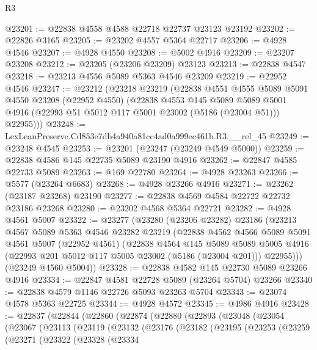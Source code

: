 \begin{lexlean}{R3}
\begin{coremodule}
@23201 := @22838 @4558 @4588 @22718 @22737 @23123 @23192
@23202 := @22826 @3165
@23205 := @23202 @4557 @5364 @22717
@23206 := @4928 @4546
@23207 := @4928 @4550
@23208 := @5002 @4916
@23209 := @23207 @23208
@23212 := @23205 (@23206 @23209) @23123
@23213 := @22838 @4547
@23218 := @23213 @4556 @5089 @5363 @4546 @23209
@23219 := @22952 @4546
@23247 := @23212
    (@23218
      @23219
      (@22838
        @4551
        @4555
        @5089
        @5091
        @4550
        @23208
        (@22952 @4550)
        (@22838
          @4553
          @145
          @5089
          @5089
          @5001
          @4916
          (@22993 @51 @5012 @117 @5001 @23002 (@5186 (@23004 @51)))
          @22955)))
@23248 := LexLeanPreserve.Cd853e7db4a940a81cc4ad0a999ec461b.R3.__rel_45
@23249 := @23248 @4545
@23253 := @23201 (@23247 (@23249 @4549 @5000))
@23259 := @22838 @4586 @145 @22735 @5089 @23190 @4916
@23262 := @22847 @4585 @22733 @5089
@23263 := @169 @22780
@23264 := @4928 @23263
@23266 := @5577 (@23264 @6683)
@23268 := @4928 @23266 @4916
@23271 := @23262 (@23187 @23268) @23190
@23277 := @22838 @4569 @4584 @22722 @22732 @23186 @23268
@23280 := @23202 @4568 @5364 @22721
@23282 := @4928 @4561 @5007
@23322 := @23277
    (@23280
      (@23206 @23282)
      @23186
      (@23213
        @4567
        @5089
        @5363
        @4546
        @23282
        @23219
        (@22838
          @4562
          @4566
          @5089
          @5091
          @4561
          @5007
          (@22952 @4561)
          (@22838
            @4564
            @145
            @5089
            @5089
            @5005
            @4916
            (@22993 @201 @5012 @117 @5005 @23002 (@5186 (@23004 @201)))
            @22955)))
      (@23249 @4560 @5004))
@23328 := @22838 @4582 @145 @22730 @5089 @23266 @4916
@23334 := @22847 @4581 @22728 @5089 (@23264 @5704) @23266
@23340 := @22838 @4579 @1146 @22726 @5093 @23263 @5704
@23343 := @23074 @4578 @5363 @22725
@23344 := @4928 @4572
@23345 := @4986 @4916
@23428 := @22837
    (@22844
      (@22860
        (@22874
          (@22880
            (@22893
              (@23048
                (@23054
                  (@23067
                    (@23113
                      (@23119
                        (@23132
                          (@23176
                            (@23182
                              (@23195
                                (@23253
                                  (@23259
                                    (@23271
                                      (@23322
                                        (@23328
                                          (@23334

\end{coremodule}
\end{lexlean}
